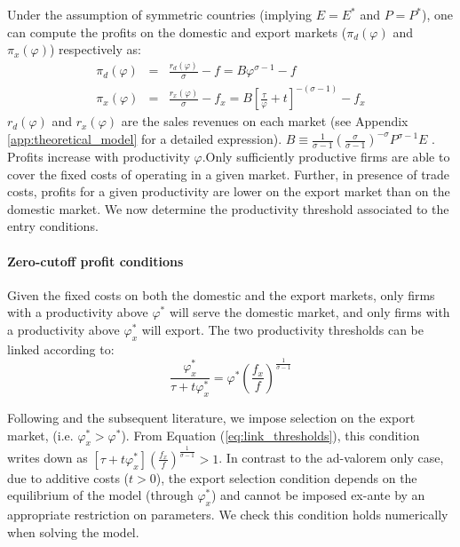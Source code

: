 \documentclass[a4paper,11pt]{article}
\begin{document}
Under the assumption of symmetric countries (implying $E=E^\ast$ and $P=P^\ast$), one can compute the profits on the domestic and export markets ($\pi_d(\varphi)$ and $\pi_x(\varphi)$) respectively as:
\begin{eqnarray}
\pi_d(\varphi)  &=& \frac{r_d(\varphi)}{\sigma} - f = B \varphi^{\sigma-1} - f \label{eq:pid_rd}\\
\pi_x(\varphi) &=& \frac{r_x(\varphi)}{\sigma} - f_x = B \left[ \frac{\tau}{\varphi} + t\right]^{-(\sigma-1)} - f_x \label{eq:pix_rx}
\end{eqnarray}
\noindent $r_d(\varphi)$ and $r_x(\varphi)$ are the sales revenues on each market (see Appendix \ref{app:theoretical_model} for a detailed expression). $B \equiv \frac{1}{\sigma-1}\left(\frac{\sigma}{\sigma-1}\right)^{-\sigma}P^{\sigma-1}E$ . Profits increase with productivity $\varphi$.Only sufficiently productive firms are able to cover the fixed costs of operating in a given market. Further, in presence of trade costs, profits for a given productivity are lower on the export market than on the domestic market.
We now determine the productivity threshold associated to the entry conditions.


\paragraph{Zero-cutoff profit conditions} Given the fixed costs on both the domestic and the export markets, only firms with a productivity above $\varphi^\ast$ will serve the domestic market, and only firms with a productivity above $\varphi_x^\ast$ will export. The two productivity thresholds can be linked according to:
\begin{equation}
\frac{\varphi_x^\ast}{\tau+t\varphi_x^\ast} = \varphi^\ast \left( \frac{f_x}{f} \right)^{\frac{1}{\sigma-1}} \label{eq:link_thresholds}
\end{equation}

Following \cite{melitz} and the subsequent literature, we impose selection on the export market, (i.e. $\varphi_x^\ast > \varphi^\ast$). From Equation (\ref{eq:link_thresholds}), this condition writes down as $\left[\tau+ t\varphi^\ast_x \right] \left( \frac{f_x}{f} \right)^{\frac{1}{\sigma-1}} >1$. In contrast to the ad-valorem only case, due to additive costs ($t>0$), the export selection condition depends on the equilibrium of the model (through $\varphi^\ast_x $) and cannot be imposed ex-ante by an appropriate restriction on parameters. We check this condition holds numerically when solving the model.
\end{document}
